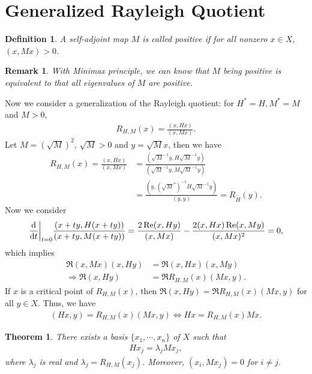 \documentclass[11pt]{book}
\newtheorem{definition}{Definition}[section]
\newtheorem{theorem}{Theorem}[section]
\newtheorem{remark}{Remark}[section]
\theoremstyle{definition}
\numberwithin{equation}{subsection}
\begin{document}
\medskip

\section{Generalized Rayleigh Quotient}

\begin{definition}
A self-adjoint map $M$ is called positive if for all nonzero $x\in X$, $(x, Mx) > 0$.
\end{definition}

\begin{remark}
With Minimax principle, we can know that $M$ being positive is equivalent to that all eigenvalues of $M$ are positive.
\end{remark}

Now we consider a generalization of the Rayleigh quotient: for $H^* = H, M^* = M$ and $M > 0$, 
\begin{align*}
    R_{H,M}(x) = \frac{(x,Hx)}{(x,Mx)}.
\end{align*}
Let $M = \left(\sqrt{M}\right)^2$, $\sqrt{M} > 0$ and $y = \sqrt{M} x$, then we have
\begin{align*}
    R_{H,M}(x) = \frac{(x,Hx)}{(x,Mx)} & = \frac{\left(\sqrt{M}^{-1}y, H\sqrt{M}^{-1}y\right)}{\left(\sqrt{M}^{-1}y, M\sqrt{M}^{-1}y\right)} \\
    & = \frac{\left(y,\left(\sqrt{M}^*\right)^{-1}H \sqrt{M}^{-1} y \right)}{(y,y)} = R_{\widetilde{H}}(y).
\end{align*}
Now we consider
\begin{align*}
    \dv{}{t}\bigg|_{t = 0} \frac{\left(x+ty,H(x+ty)\right)}{\left(x+ty,M(x+ty)\right)} = \frac{2\Re(x,Hy)}{(x,Mx)} - \frac{2(x,Hx)\Re(x,My)}{(x,Mx)^2} = 0,
\end{align*}
which implies 
\begin{align*}
    \Re(x,Mx)(x,Hy) & = \Re(x,Hx)(x,My) \\
    \Rightarrow \Re(x,Hy) & = \Re R_{H,M}(x) (Mx,y).
\end{align*}
If $x$ is a critical point of $R_{H,M}(x)$, then $\Re(x,Hy)  = \Re R_{H,M}(x) (Mx,y)$ for all $y\in X$. Thus, we have
\begin{align*}
    (Hx, y) = R_{H,M}(x) (Mx,y) \iff Hx = R_{H,M}(x) Mx.
\end{align*}

\medskip

\begin{theorem}
There exists a basis $\{x_1,\cdots,x_n\}$ of $X$ such that 
\begin{align*}
    Hx_j = \lambda_j M x_j, 
\end{align*}
where $\lambda_j$ is real and $\lambda_j = R_{H,M}(x_j)$. Moreover, $\left(x_i, Mx_j\right) = 0$ for $i\neq j$.
\end{theorem}
\end{document}
